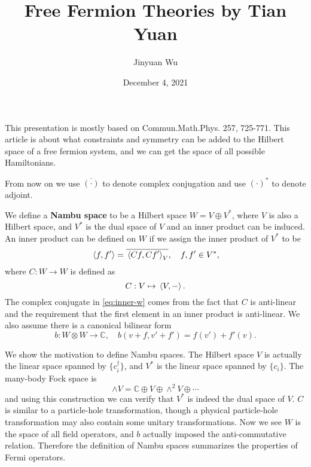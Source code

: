 \documentclass[hyperref, a4paper]{article}
\title{Free Fermion Theories by Tian Yuan}
\author{Jinyuan Wu}
\date{December 4, 2021}
\newcommand*{\concept}[1]{{\textbf{#1}}}
\begin{document}
\maketitle

This presentation is mostly based on Commun.Math.Phys. 257, 725-771. This article is about what constraints and 
symmetry can be added to the Hilbert space of a free fermion system, and we can get the space of all possible 
Hamiltonians. 

From now on we use $\overline{(\cdot)}$ to denote complex conjugation and use $(\cdot)^*$ to denote adjoint.

We define a \concept{Nambu space} to be a Hilbert space $W = V \oplus V^*$, where $V$ is also a Hilbert space,
and $V^*$ is the dual space of $V$ and an inner product can be induced. An inner product can be defined on $W$
if we assign the inner product of $V^*$ to be  
\begin{equation}
    \expval*{f, f'} = \overline{\expval*{Cf, Cf'}_V}, \quad f, f' \in V^*,
    \label{eq:inner-w}
\end{equation}
where $C: W \to W$ is defined as 
\begin{equation}
    C: V \mapsto \expval*{V, -}.
\end{equation} 
The complex conjugate in \eqref{eq:inner-w} comes from the fact that $C$ is anti-linear and the requirement that 
the first element in an inner product is anti-linear. We also assume there is a canonical bilinear form 
\begin{equation}
    b: W \otimes W \to \mathbb{C}, \quad b(v+f, v'+f') = f(v') + f'(v).
\end{equation}

We show the motivation to define Nambu spaces. The Hilbert space $V$ is actually the linear space spanned by 
$\{c_i^\dagger\}$, and $V^*$ is the linear space spanned by $\{c_i\}$. The many-body Fock space is 
\begin{equation}
    \wedge V = \mathbb{C} \oplus V \oplus \wedge^2 V \oplus \cdots
\end{equation}
and using this construction we can verify that $V^*$ is indeed the dual space of $V$.
$C$ is similar to a particle-hole transformation, though a physical particle-hole transformation may also contain
some unitary transformations. Now we see $W$ is the space of all field operators, and $b$ actually imposed the
anti-commutative relation. Therefore the definition of Nambu spaces summarizes the properties of Fermi operators.
\end{document}

